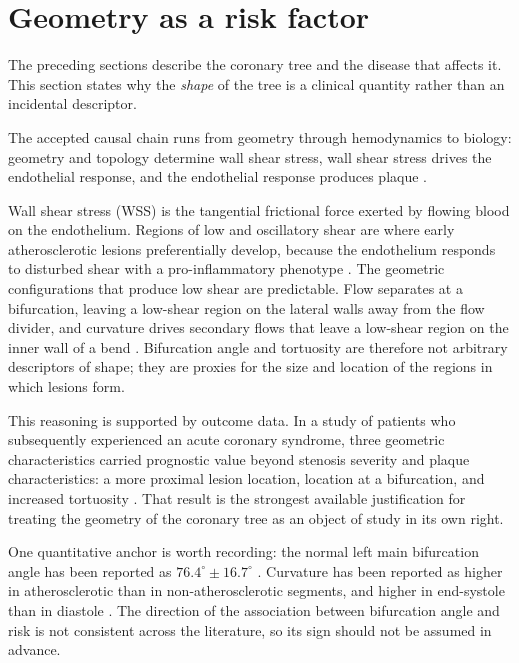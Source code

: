 
\section{Geometry as a risk factor}
\label{sec:geometry}

The preceding sections describe the coronary tree and the disease that affects it.
This section states why the \emph{shape} of the tree is a clinical quantity rather than an
incidental descriptor.

The accepted causal chain runs from geometry through hemodynamics to biology: geometry and
topology determine wall shear stress, wall shear stress drives the endothelial response, and
the endothelial response produces plaque \cite{rampidis2022geometry}.

Wall shear stress (WSS) is the tangential frictional force exerted by flowing blood on the
endothelium.
Regions of low and oscillatory shear are where early atherosclerotic lesions preferentially
develop, because the endothelium responds to disturbed shear with a pro-inflammatory
phenotype \cite{rampidis2022geometry}.
The geometric configurations that produce low shear are predictable.
Flow separates at a bifurcation, leaving a low-shear region on the lateral walls away from
the flow divider, and curvature drives secondary flows that leave a low-shear region on the
inner wall of a bend \cite{rampidis2022geometry}.
Bifurcation angle and tortuosity are therefore not arbitrary descriptors of shape; they are
proxies for the size and location of the regions in which lesions form.

This reasoning is supported by outcome data.
In a study of patients who subsequently experienced an acute coronary syndrome, three
geometric characteristics carried prognostic value beyond stenosis severity and plaque
characteristics: a more proximal lesion location, location at a bifurcation, and increased
tortuosity \cite{han2022plaque}.
That result is the strongest available justification for treating the geometry of the
coronary tree as an object of study in its own right.

One quantitative anchor is worth recording: the normal left main bifurcation angle has been
reported as $76.4^\circ \pm 16.7^\circ$ \cite{rampidis2022geometry}.
Curvature has been reported as higher in atherosclerotic than in non-atherosclerotic segments,
and higher in end-systole than in diastole \cite{rampidis2022geometry}.
The direction of the association between bifurcation angle and risk is not consistent across
the literature, so its sign should not be assumed in advance.

